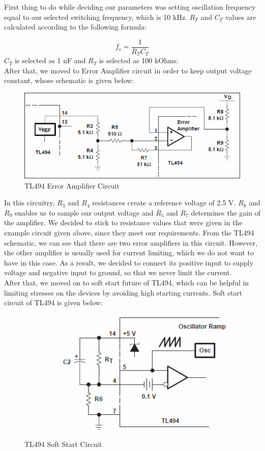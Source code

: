 \documentclass{article}
\newcommand\tab[1][1cm]{\hspace*{#1}}
\begin{document}
\tab First thing to do while deciding our parameters was setting oscillation frequency equal to our selected switching frequency, which is 10 kHz. $R_T$ and $C_T$ values are calculated according to the following formula:

\begin{equation*}
    f_s=\frac{1}{R_TC_T}
\end{equation*}
$C_T$ is selected as 1 nF and $R_T$ is selected as 100 kOhms.  \\
After that, we moved to Error Amplifier circuit in order to keep output voltage constant, whose schematic is given below:

\begin{figure}[H]
    \centering
    \includegraphics[scale=0.5]{error.png}
    \caption{TL494 Error Amplifier Circuit}
    \label{fig:my_label}
\end{figure}

\tab In this circuitry, $R_3$ and $R_4$ resistances create a reference voltage of 2.5 V. $R_8$ and $R_9$ enables us to sample our output voltage and $R_5$ and $R_7$ determines the gain of the amplifier. We decided to stick to resistance values that were given in the example circuit given above, since they meet our requirements. From the TL494 schematic, we can see that there are two error amplifiers in this circuit. However, the other amplifier is usually used for current limiting, which we do not want to have in this case. As a result, we decided to connect its positive input to supply voltage and negative input to ground, so that we never limit the current. \\

\tab After that, we moved on to soft start future of TL494, which can be helpful in limiting stresses on the devices by avoiding high starting currents. Soft start circuit of TL494 is given below:

\begin{figure}[H]
    \centering
    \includegraphics[scale=0.5]{soft.PNG}
    \caption{TL494 Soft Start Circuit}
    \label{fig:my_label}
\end{figure}
\end{document}

